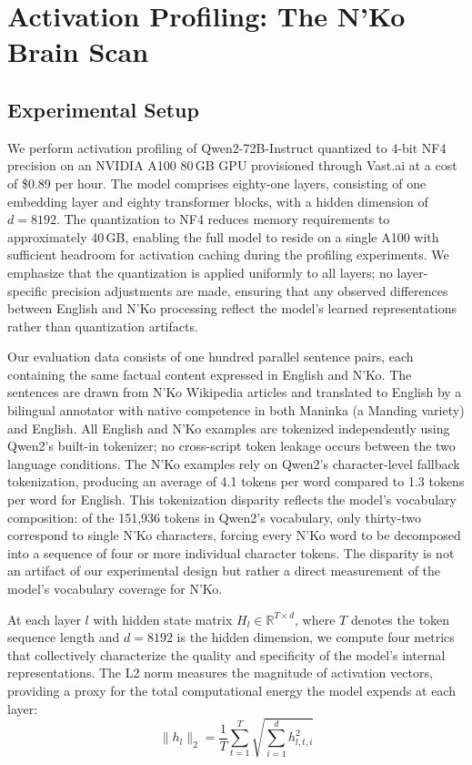 \documentclass[11pt]{article}
\newcommand{\nko}{N'Ko}
\begin{document}
\section{Activation Profiling: The \nko{} Brain Scan}
\label{sec:brain_scan}

\subsection{Experimental Setup}
\label{sec:brain_setup}

We perform activation profiling of Qwen2-72B-Instruct quantized to 4-bit NF4 precision on an NVIDIA A100 80\,GB GPU provisioned through Vast.ai at a cost of \$0.89 per hour. The model comprises eighty-one layers, consisting of one embedding layer and eighty transformer blocks, with a hidden dimension of $d = 8192$. The quantization to NF4 reduces memory requirements to approximately 40\,GB, enabling the full model to reside on a single A100 with sufficient headroom for activation caching during the profiling experiments. We emphasize that the quantization is applied uniformly to all layers; no layer-specific precision adjustments are made, ensuring that any observed differences between English and \nko{} processing reflect the model's learned representations rather than quantization artifacts.

Our evaluation data consists of one hundred parallel sentence pairs, each containing the same factual content expressed in English and \nko{}. The sentences are drawn from \nko{} Wikipedia articles and translated to English by a bilingual annotator with native competence in both Maninka (a Manding variety) and English. All English and \nko{} examples are tokenized independently using Qwen2's built-in tokenizer; no cross-script token leakage occurs between the two language conditions. The \nko{} examples rely on Qwen2's character-level fallback tokenization, producing an average of 4.1 tokens per word compared to 1.3 tokens per word for English. This tokenization disparity reflects the model's vocabulary composition: of the 151,936 tokens in Qwen2's vocabulary, only thirty-two correspond to single \nko{} characters, forcing every \nko{} word to be decomposed into a sequence of four or more individual character tokens. The disparity is not an artifact of our experimental design but rather a direct measurement of the model's vocabulary coverage for \nko{}.

At each layer $l$ with hidden state matrix $H_l \in \mathbb{R}^{T \times d}$, where $T$ denotes the token sequence length and $d = 8192$ is the hidden dimension, we compute four metrics that collectively characterize the quality and specificity of the model's internal representations. The L2 norm measures the magnitude of activation vectors, providing a proxy for the total computational energy the model expends at each layer:
\begin{equation}
\|h_l\|_2 = \frac{1}{T} \sum_{t=1}^{T} \sqrt{\sum_{i=1}^{d} h_{l,t,i}^2}
\label{eq:l2norm}
\end{equation}
\end{document}
